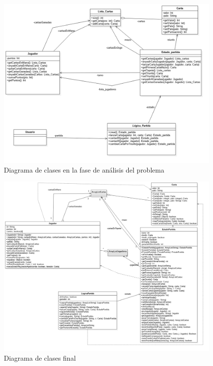 \begin{figure}[H]
\hspace{-1cm}
\includegraphics[scale = 0.5]{figuras/logica_juego/diagramaClasesDisenyo.png}
\caption{Diagrama de clases en la fase de análisis del problema}
\label{fig:diagramaClasesLogicaJuegoInicial}
\end{figure}

\begin{figure}[H]
\hspace{-2cm}
\includegraphics[scale = 0.4]{figuras/logica_juego/diagramaClasesImplementacion.png}
\caption{Diagrama de clases final}
\label{fig:diagramaClasesLogicaJuegoFinal}
\end{figure}


